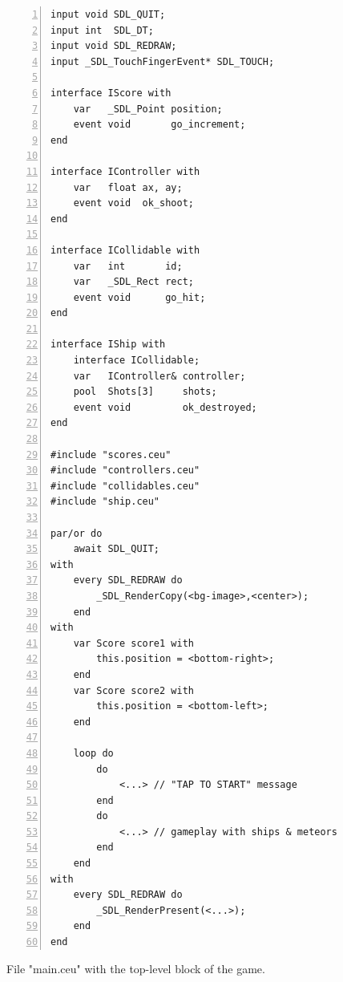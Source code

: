 \documentclass[preprint]{sigplanconf}
\newcommand{\1}{\;}
\newcommand{\2}{\;\;}
\newcommand{\3}{\;\;\;}
\newcommand{\5}{\;\;\;\;\;}
\begin{document}
\begin{figure}[t]
\begin{lstlisting}[numbers=left,xleftmargin=3em]
input void SDL_QUIT;
input int  SDL_DT;
input void SDL_REDRAW;
input _SDL_TouchFingerEvent* SDL_TOUCH;

interface IScore with
    var   _SDL_Point position;
    event void       go_increment;
end

interface IController with
    var   float ax, ay;
    event void  ok_shoot;
end

interface ICollidable with
    var   int       id;
    var   _SDL_Rect rect;
    event void      go_hit;
end

interface IShip with
    interface ICollidable;
    var   IController& controller;
    pool  Shots[3]     shots;
    event void         ok_destroyed;
end

#include "scores.ceu"
#include "controllers.ceu"
#include "collidables.ceu"
#include "ship.ceu"

par/or do
    await SDL_QUIT;
with
    every SDL_REDRAW do
        _SDL_RenderCopy(<bg-image>,<center>);
    end
with
    var Score score1 with
        this.position = <bottom-right>;
    end
    var Score score2 with
        this.position = <bottom-left>;
    end

    loop do
        do
            <...> // "TAP TO START" message
        end
        do
            <...> // gameplay with ships & meteors
        end
    end
with
    every SDL_REDRAW do
        _SDL_RenderPresent(<...>);
    end
end
\end{lstlisting}
\caption{ File "main.ceu" with the top-level block of the game.
\label{lst.apps.rocks.1}
}
\end{figure}
\end{document}
